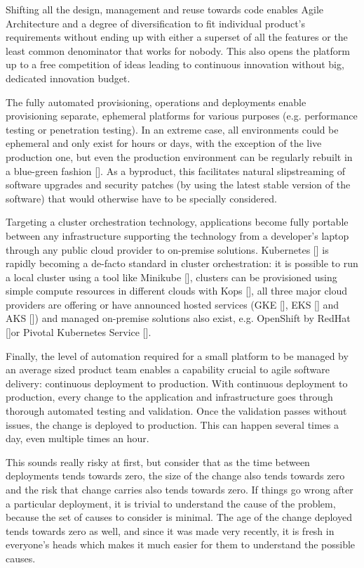 \documentclass[reprint,amsmath,amssymb,aps]{revtex4-1}
\begin{document}
Shifting all the design, management and reuse towards code enables Agile Architecture and a degree of diversification to fit individual product’s requirements without ending up with either a superset of all the features or the least common denominator that works for nobody. This also opens the platform up to a free competition of ideas leading to continuous innovation without big, dedicated innovation budget.

The fully automated provisioning, operations and deployments enable provisioning separate, ephemeral platforms for various purposes (e.g. performance testing or penetration testing). In an extreme case, all environments could be ephemeral and only exist for hours or days, with the exception of the live production one, but even the production environment can be regularly rebuilt in a blue-green fashion []. As a byproduct, this facilitates natural slipstreaming of software upgrades and security patches (by using the latest stable version of the software) that would otherwise have to be specially considered.

Targeting a cluster orchestration technology, applications become fully portable between any infrastructure supporting the technology from a developer’s laptop through any public cloud provider to on-premise solutions. Kubernetes [] is rapidly becoming a de-facto standard in cluster orchestration: it is possible to run a local cluster using a tool like Minikube [], clusters can be provisioned using simple compute resources in different clouds with Kops [], all three major cloud providers are offering or have announced hosted services (GKE [], EKS [] and AKS []) and managed on-premise solutions also exist, e.g. OpenShift by RedHat []or Pivotal Kubernetes Service [].

Finally, the level of automation required for a small platform to be managed by an average sized product team enables a capability crucial to agile software delivery: continuous deployment to production. With continuous deployment to production, every change to the application and infrastructure goes through thorough automated testing and validation. Once the validation passes without issues, the change is deployed to production. This can happen several times a day, even multiple times an hour.

This sounds really risky at first, but consider that as the time between deployments tends towards zero, the size of the change also tends towards zero and the risk that change carries also tends towards zero. If things go wrong after a particular deployment, it is trivial to understand the cause of the problem, because the set of causes to consider is minimal. The age of the change deployed tends towards zero as well, and since it was made very recently, it is fresh in everyone’s heads which makes it much easier for them to understand the possible causes.
\end{document}
